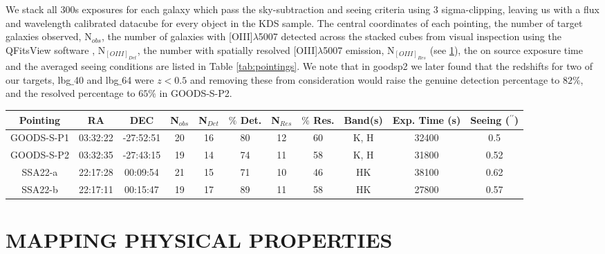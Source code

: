 \documentclass[fleqn,usenatbib]{mn2e}
\begin{document}
We stack all 300s exposures for each galaxy which pass the sky-subtraction and seeing criteria using 3 sigma-clipping, leaving us with a flux and wavelength calibrated datacube for every object in the KDS sample.
The central coordinates of each pointing, the number of target galaxies observed, N$_{obs}$, the number of galaxies with [OIII]$\lambda$5007 detected across the stacked cubes from visual inspection using the QFitsView software \citep{Ott2012}, N$_{[OIII]_{Det}}$, the number with spatially resolved [OIII]$\lambda$5007 emission, N$_{[OIII]_{Res}}$ (see \cref{sec:extracting_properties}), the on source exposure time and the averaged seeing conditions are listed in Table \ref{tab:pointings}.
We note that in goodsp2 we later found that the redshifts for two of our targets, lbg$\_$40 and lbg$\_$64 were $z < 0.5$ and removing these from consideration would raise the genuine detection percentage to $82\%$, and the resolved percentage to $65\%$ in GOODS-S-P2.

\begin{table*}
\centering
\caption{Summary of KDS pointing statistics}
\label{tab:pointings}
\begin{tabular}{c c c c c c c c c c c}

 \hline
Pointing & RA & DEC & N$_{obs}$ & N$_{Det}$ & $\%$ Det. & N$_{Res}$ & $\%$ Res. & Band(s) & Exp. Time (s) & Seeing ($^{\prime\prime}$)  \\
 \hline
 GOODS-S-P1 & 03:32:22 & -27:52:51 & 20 & 16 & 80 & 12 & 60 & K, H & 32400 & 0.5 \\
GOODS-S-P2 & 03:32:35 & -27:43:15 & 19 & 14 & 74 & 11 & 58 & K, H & 31800 & 0.52 \\
SSA22-a & 22:17:28 & 00:09:54 & 21 & 15 & 71 & 10 & 46 & HK & 38100 & 0.62 \\
SSA22-b & 22:17:11 & 00:15:47 & 19 & 17 & 89 & 11 & 58 & HK & 27800 & 0.57 \\
 \hline
\end{tabular}
\end{table*}

\section{MAPPING PHYSICAL PROPERTIES}\label{sec:extracting_properties}
\end{document}
